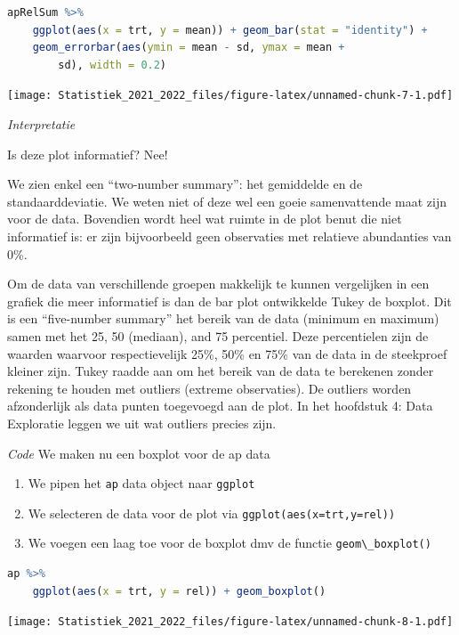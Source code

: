 \documentclass[
  12pt,dutch,coursenotes]{book}
\newcommand{\passthrough}[1]{#1}
\providecommand{\tightlist}{%
  \setlength{\itemsep}{0pt}\setlength{\parskip}{0pt}}
\theoremstyle{definition}
\theoremstyle{definition}
\theoremstyle{definition}
\theoremstyle{definition}
\theoremstyle{remark}
\begin{document}
\begin{lstlisting}[language=R]
apRelSum %>%
    ggplot(aes(x = trt, y = mean)) + geom_bar(stat = "identity") +
    geom_errorbar(aes(ymin = mean - sd, ymax = mean +
        sd), width = 0.2)
\end{lstlisting}

\texttt{[image: Statistiek\_2021\_2022\_files/figure-latex/unnamed-chunk-7-1.pdf]}

\emph{Interpretatie}

Is deze plot informatief? Nee!

We zien enkel een ``two-number summary'': het gemiddelde en de standaarddeviatie. We weten niet of deze wel een goeie samenvattende maat zijn voor de data. Bovendien wordt heel wat ruimte in de plot benut die niet informatief is: er zijn bijvoorbeeld geen observaties met relatieve abundanties van 0\%.

Om de data van verschillende groepen makkelijk te kunnen vergelijken in een grafiek die meer informatief is dan de bar plot ontwikkelde Tukey de boxplot. Dit is een ``five-number summary'' het bereik van de data (minimum en maximum) samen met het 25, 50 (mediaan), and 75 percentiel. Deze percentielen zijn de waarden waarvoor respectievelijk 25\%, 50\% en 75\% van de data in de steekproef kleiner zijn. Tukey raadde aan om het bereik van de data te berekenen zonder rekening te houden met outliers (extreme observaties). De outliers worden afzonderlijk als data punten toegevoegd aan de plot. In het hoofdstuk 4: Data Exploratie leggen we uit wat outliers precies zijn.

\emph{Code}
We maken nu een boxplot voor de ap data

\begin{enumerate}
\def\labelenumi{\arabic{enumi}.}
\tightlist
\item
  We pipen het \passthrough{\lstinline!ap!} data object naar \passthrough{\lstinline!ggplot!}
\item
  We selecteren de data voor de plot via \passthrough{\lstinline!ggplot(aes(x=trt,y=rel))!}
\item
  We voegen een laag toe voor de boxplot dmv de functie \passthrough{\lstinline!geom\_boxplot()!}
\end{enumerate}

\begin{lstlisting}[language=R]
ap %>%
    ggplot(aes(x = trt, y = rel)) + geom_boxplot()
\end{lstlisting}

\texttt{[image: Statistiek\_2021\_2022\_files/figure-latex/unnamed-chunk-8-1.pdf]}
\end{document}
